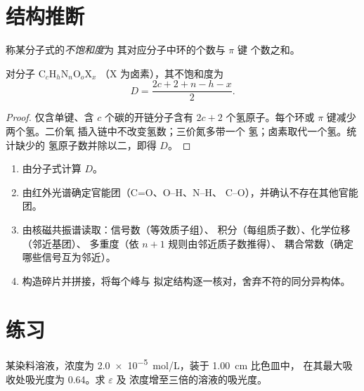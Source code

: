 \section{结构推断}

\begin{definition}[不饱和度]\label{def:b1:structure-spectroscopy:unsaturation}
称某分子式的\emph{不饱和度}为
其对应分子中环的个数与 $\pi$ 键
个数之和。
\end{definition}

\begin{proposition}[由分子式求不饱和度]\label{prop:b1:structure-spectroscopy:unsaturation-formula}
对分子 $\mathrm{C}_c\mathrm{H}_h\mathrm{N}_n\mathrm{O}_o\mathrm{X}_x$
（X 为卤素），其不饱和度为
\[
  D = \frac{2c + 2 + n - h - x}{2} .
\]
\end{proposition}

\begin{proof}
仅含单键、含 $c$ 个碳的开链分子含有 $2c + 2$
个氢原子。每个环或 $\pi$ 键减少两个氢。二价氧
插入链中不改变氢数；三价氮多带一个
氢；卤素取代一个氢。统计缺少的
氢原子数并除以二，即得 $D$。
\end{proof}

\begin{method}[结构推断]\label{met:b1:structure-spectroscopy:solve-structure}
\begin{enumerate}
  \item 由分子式计算 $D$。
  \item 由红外光谱确定官能团（C=O、O--H、N--H、
        C--O），并确认不存在其他官能团。
  \item 由核磁共振谱读取：信号数（等效质子组）、
        积分（每组质子数）、化学位移（邻近基团）、
        多重度（依 $n + 1$ 规则由邻近质子数推得）、
        耦合常数（确定哪些信号互为邻近）。
  \item 构造碎片并拼接，将每个峰与
        拟定结构逐一核对，舍弃不符的同分异构体。
\end{enumerate}
\end{method}

\section{练习}

\begin{exercise}[$\star$]\label{exo:b1:structure-spectroscopy:1}
某染料溶液，浓度为 \qty{2.0e-5}{mol/L}，装于 \qty{1.00}{cm} 比色皿中，
在其最大吸收处吸光度为 0.64。求 $\varepsilon$ 及
浓度增至三倍的溶液的吸光度。
\end{exercise}

